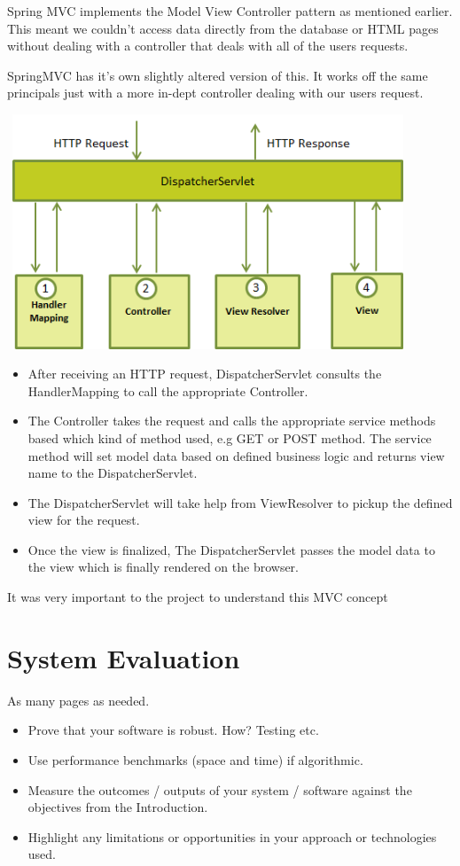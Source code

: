 Spring MVC implements the Model View Controller pattern as mentioned earlier. This meant we couldn't access data directly from the database or HTML pages without dealing with a controller that deals with all of the users requests.

SpringMVC has it's own slightly altered version of this. It works off the same principals just with a more in-dept controller dealing with our users request.

\begin{center}    
	\includegraphics[height=7cm, width=12cm]{img/springmvc.png}
\end{center}

\begin{itemize}	
\item{ After receiving an HTTP request, DispatcherServlet consults the HandlerMapping to call the appropriate Controller.}
\item{ The Controller takes the request and calls the appropriate service methods based which kind of method used, e.g GET or POST method. The service method will set model data based on defined business logic and returns view name to the DispatcherServlet.}
\item{ The DispatcherServlet will take help from ViewResolver to pickup the defined view for the request.}
\item{Once the view is finalized, The DispatcherServlet passes the model data to the view which is finally rendered on the browser.}
\end{itemize}	

It was very important to the project to understand this MVC concept

\chapter{System Evaluation}
As many pages as needed.
\begin{itemize}
\item Prove that your software is robust. How? Testing etc. 
\item Use performance benchmarks (space and time) if algorithmic.
\item Measure the outcomes / outputs of your system / software against the objectives from the Introduction.
\item Highlight any limitations or opportunities in your approach or technologies used.
\end{itemize}

